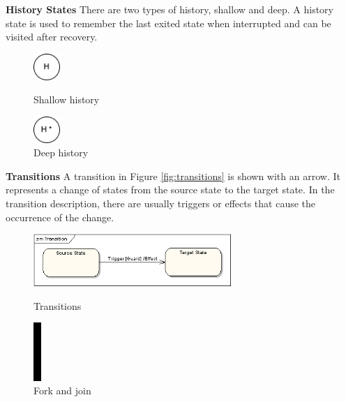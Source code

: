 \textbf{History States}
There are two types of history, shallow and deep.
A history state is used to remember the last exited state when interrupted and can be visited after recovery.
\begin{figure}[htbp]
\begin{minipage}[t]{0.4\textwidth}
\centering
\includegraphics[width=1cm]{Bilder/shallow.png}
\caption{Shallow history}
\end{minipage}
\begin{minipage}[t]{0.4\textwidth}
\centering
\includegraphics[width=1cm]{Bilder/deep.png}
\caption{Deep history}
\end{minipage}
\end{figure}

\textbf{Transitions}
A transition in Figure \ref{fig:transitions} is shown with an arrow.
It represents a change of states from the source state to the target state\cite{miles_hamilton_2008}.
In the transition description, there are usually triggers or effects that cause the occurrence of the change.
\begin{figure}[htbp]
\begin{minipage}[t]{0.7\textwidth}
\centering
\includegraphics[width=7.5cm]{Bilder/sm6.png}
\caption{Transitions\cite{state_machine_diagram}}
\label{fig:transitions}
\end{minipage}
\begin{minipage}[t]{0.2\textwidth}
\centering
\includegraphics[width=0.3cm]{Bilder/join.png}
\caption{Fork and join}
\label{fig:fork}
\end{minipage}
\end{figure}

